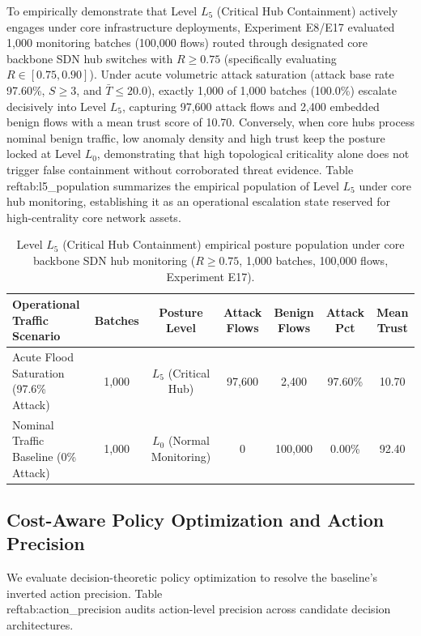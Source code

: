 \documentclass[journal,10pt,onecolumn]{IEEEtran}
\begin{document}
To empirically demonstrate that Level $L_5$ (Critical Hub Containment) actively engages under core infrastructure deployments, Experiment E8/E17 evaluated 1,000 monitoring batches (100,000 flows) routed through designated core backbone SDN hub switches with $R \ge 0.75$ (specifically evaluating $R \in [0.75, 0.90]$). Under acute volumetric attack saturation (attack base rate 97.60\%, $S \ge 3$, and $\bar{T} \le 20.0$), exactly 1,000 of 1,000 batches (100.0\%) escalate decisively into Level $L_5$, capturing 97,600 attack flows and 2,400 embedded benign flows with a mean trust score of 10.70. Conversely, when core hubs process nominal benign traffic, low anomaly density and high trust keep the posture locked at Level $L_0$, demonstrating that high topological criticality alone does not trigger false containment without corroborated threat evidence. Table~\\ref{tab:l5_population} summarizes the empirical population of Level $L_5$ under core hub monitoring, establishing it as an operational escalation state reserved for high-centrality core network assets.

\begin{table}[t]
\caption{Level $L_5$ (Critical Hub Containment) empirical posture population under core backbone SDN hub monitoring ($R \ge 0.75$, 1,000 batches, 100,000 flows, Experiment E17).}
\label{tab:l5_population}
\centering
\small
\begin{tabular}{lcccccc}
\toprule
\textbf{Operational Traffic Scenario} & \textbf{Batches} & \textbf{Posture Level} & \textbf{Attack Flows} & \textbf{Benign Flows} & \textbf{Attack Pct} & \textbf{Mean Trust} \\
\midrule
Acute Flood Saturation (97.6\% Attack) & 1,000 & $L_5$ (Critical Hub) & 97,600 & 2,400 & 97.60\% & 10.70 \\
Nominal Traffic Baseline (0\% Attack) & 1,000 & $L_0$ (Normal Monitoring) & 0 & 100,000 & 0.00\% & 92.40 \\
\bottomrule
\end{tabular}
\end{table}

\subsection{Cost-Aware Policy Optimization and Action Precision}
We evaluate decision-theoretic policy optimization to resolve the baseline's inverted action precision. Table~\\ref{tab:action_precision} audits action-level precision across candidate decision architectures.
\end{document}
